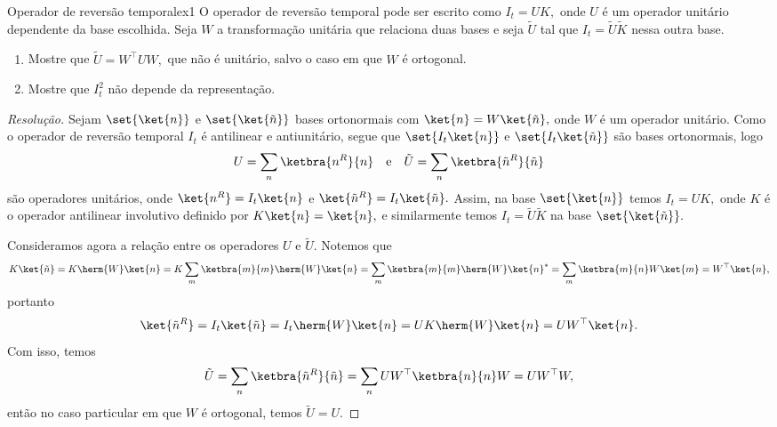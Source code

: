 \begin{exercício}{Operador de reversão temporal}{ex1}
    O operador de reversão temporal pode ser escrito como \(I_t = UK,\) onde \(U\) é um operador unitário dependente da base escolhida. Seja \(W\) a transformação unitária que relaciona duas bases e seja \(\tilde{U}\) tal que \(I_t = \tilde{U} \tilde{K}\) nessa outra base.
    \begin{enumerate}[label=(\alph*)]
        \item Mostre que \(\tilde{U} = W^\top U W,\) que não é unitário, salvo o caso em que \(W\) é ortogonal.
        \item Mostre que \(I_t^2\) não depende da representação.
    \end{enumerate}
\end{exercício}
\begin{proof}[Resolução]
    Sejam \(\set{\ket{n}}\) e \(\set{\ket{\tilde{n}}}\) bases ortonormais com \(\ket{n} = W\ket{\tilde{n}},\) onde \(W\) é um operador unitário. Como o operador de reversão temporal \(I_t\) é antilinear e antiunitário, segue que \(\set{I_t \ket{n}}\) e \(\set{I_t \ket{\tilde{n}}}\) são bases ortonormais, logo
    \begin{equation*}
        U = \sum_{n}{\ketbra{n^R}{n}}\quad\text{e}\quad \tilde{U} = \sum_{n}{\ketbra{\tilde{n}^R}{\tilde{n}}}
    \end{equation*}
    são operadores unitários, onde \(\ket{n^R} = I_t\ket{n}\) e \(\ket{\tilde{n}^R} = I_t \ket{\tilde{n}}.\) Assim, na base \(\set{\ket{n}}\) temos \(I_t = U K,\) onde \(K\) é o operador antilinear involutivo definido por \(K\ket{n} = \ket{n},\) e similarmente temos \(I_t = \tilde{U} \tilde{K}\) na base \(\set{\ket{\tilde{n}}}.\) 

    Consideramos agora a relação entre os operadores \(U\) e \(\tilde{U}.\) Notemos que
    \begin{equation*}
        K\ket{\tilde{n}} = K \herm{W}\ket{n} = K \sum_{m}{\ketbra{m}{m}\herm{W}\ket{n}}= \sum_{m}{\ketbra{m}{m}\herm{W} \ket{n}^*} = \sum_{m}{\ketbra{m}{n}W\ket{m}} = W^\top\ket{n},
    \end{equation*}
    portanto
    \begin{equation*}
        \ket{\tilde{n}^R} = I_t \ket{\tilde{n}} = I_t \herm{W} \ket{n} = U K \herm{W} \ket{n} = U W^\top \ket{n}.
    \end{equation*}
    Com isso, temos
    \begin{equation*}
        \tilde{U} = \sum_{n}{\ketbra{\tilde{n}^R}{\tilde{n}}} = \sum_{n}{U W^\top\ketbra{n}{n}W} = UW^\top W,
    \end{equation*}
    então no caso particular em que \(W\) é ortogonal, temos \(\tilde{U} = U.\)


\end{proof}
